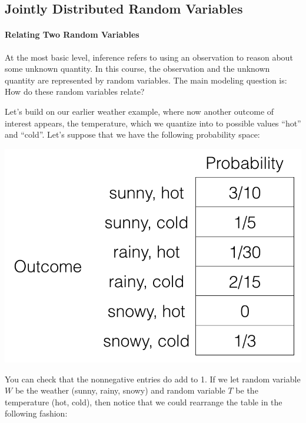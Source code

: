 \documentclass[6008notes.tex]{subfiles}
\begin{document}
\graphicspath{ {images/jointdist/} }

\subsection{Jointly Distributed Random Variables}

\paragraph{Relating Two Random Variables}

At the most basic level, inference refers to using an observation to reason about some unknown quantity. In this course, the observation and the unknown quantity are represented by random variables. The main modeling question is: How do these random variables relate?

Let's build on our earlier weather example, where now another outcome of interest appears, the temperature, which we quantize into to possible values ``hot'' and ``cold''. Let's suppose that we have the following probability space:

{\centering\includegraphics[scale=0.4]{images_sec-joint-rv-prob-space}}

You can check that the nonnegative entries do add to 1. If we let random variable $W$ be the weather (sunny, rainy, snowy) and random variable $T$ be the temperature (hot, cold), then notice that we could rearrange the table in the following fashion:
\end{document}
